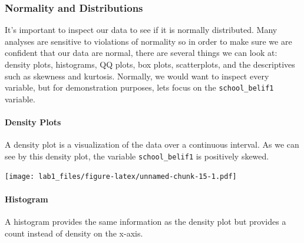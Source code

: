 \documentclass[
]{article}
\newenvironment{Shaded}{\begin{snugshade}}{\end{snugshade}}
\newcommand{\AttributeTok}[1]{\textcolor[rgb]{0.77,0.63,0.00}{#1}}
\newcommand{\FunctionTok}[1]{\textcolor[rgb]{0.00,0.00,0.00}{#1}}
\newcommand{\NormalTok}[1]{#1}
\newcommand{\SpecialCharTok}[1]{\textcolor[rgb]{0.00,0.00,0.00}{#1}}
\newcommand{\StringTok}[1]{\textcolor[rgb]{0.31,0.60,0.02}{#1}}
\begin{document}
\hypertarget{normality-and-distributions}{%
\subsubsection{Normality and
Distributions}\label{normality-and-distributions}}

It's important to inspect our data to see if it is normally distributed.
Many analyses are sensitive to violations of normality so in order to
make sure we are confident that our data are normal, there are several
things we can look at: density plots, histograms, QQ plots, box plots,
scatterplots, and the descriptives such as skewness and kurtosis.
Normally, we would want to inspect every variable, but for demonstration
purposes, lets focus on the \texttt{school\_belif1} variable.

\hypertarget{density-plots}{%
\paragraph{Density Plots}\label{density-plots}}

A density plot is a visualization of the data over a continuous
interval. As we can see by this density plot, the variable
\texttt{school\_belif1} is positively skewed.

\begin{Shaded}
\end{Shaded}

\texttt{[image: lab1\_files/figure-latex/unnamed-chunk-15-1.pdf]}

\hypertarget{histogram}{%
\paragraph{Histogram}\label{histogram}}

A histogram provides the same information as the density plot but
provides a count instead of density on the x-axis.

\begin{Shaded}
\end{Shaded}
\end{document}
